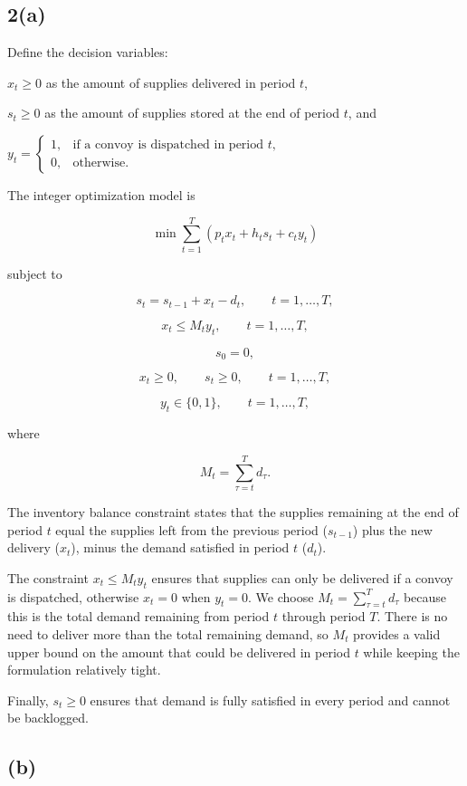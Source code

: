 \documentclass{article}
\begin{document}
\subsection*{2(a)}

Define the decision variables: 


$
x_t \geq 0
$ as the amount of supplies delivered in period $t$,

$
s_t \geq 0
$ as the amount of supplies stored at the end of period $t$, and

$
y_t =
\begin{cases}
1, & \text{if a convoy is dispatched in period } t,\\
0, & \text{otherwise.}
\end{cases}
$

The integer optimization model is

\[
\min \sum_{t=1}^{T} \left(p_t x_t + h_t s_t + c_t y_t\right)
\]

subject to

\[
s_t = s_{t-1} + x_t - d_t,
\qquad t=1,\ldots,T,
\]

\[
x_t \leq M_t y_t,
\qquad t=1,\ldots,T,
\]

\[
s_0=0,
\]

\[
x_t \geq 0,\qquad s_t \geq 0,
\qquad t=1,\ldots,T,
\]

\[
y_t\in\{0,1\},
\qquad t=1,\ldots,T,
\]

where

\[
M_t=\sum_{\tau=t}^{T}d_\tau.
\]

The inventory balance constraint states that the supplies remaining at the end of period $t$ equal the supplies left from the previous period ($s_{t-1}$) plus the new delivery ($x_t$), minus the demand satisfied in period $t$ ($d_t$). 

The constraint $x_t\leq M_ty_t$ ensures that supplies can only be delivered if a convoy is dispatched, otherwise $x_t = 0$ when $y_t = 0$. We choose $
M_t=\sum_{\tau=t}^{T}d_\tau
$ because this is the total demand remaining from period $t$ through period $T$. There is no need to deliver more than the total remaining demand, so $M_t$ provides a valid upper bound on the amount that could be delivered in period $t$ while keeping the formulation relatively tight.

Finally, $s_t\geq0$ ensures that demand is fully satisfied in every period and cannot be backlogged.

\vspace{5mm}

\subsection*{(b)}
\end{document}

